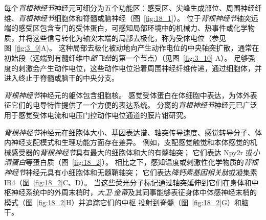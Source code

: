 每个\textit{背根神经节}神经元可细分为五个功能区：感受区、尖峰生成部位、周围神经纤维、\textit{背根神经节}细胞体和脊髓或脑神经（图~\ref{fig:18_1}）。
位于\textit{背根神经节}轴突远端的感受区包含专门的受体蛋白，可感知局部环境中的机械力、热事件或化学物质，并将这些信号转化为轴突末端的局部去极化，称为受体电位（参见图~\ref{fig:3_9}A)。
这种局部去极化被动地向产生动作电位的中央轴突扩散，通常在初始段（远端到有髓纤维中\textit{郎飞结}的第一个节点）（见图~\ref{fig:3_10} A）。
足够强度的刺激会产生动作电位，这些动作电位沿着周围神经纤维传递，通过细胞体，并进入终止于脊髓或脑干的中央分支。


\textit{背根神经节}神经元的躯体包含细胞核。 
感觉受体蛋白在体细胞中表达，为体外表征它们的电导特性提供了一个方便的表达系统。 
分离的\textit{背根神经节}神经元已广泛用于感觉受体电流和电压门控动作电位通道的膜片钳研究。


\textit{背根神经节}神经元在细胞体大小、基因表达谱、轴突传导速度、感觉转导分子、体内神经支配模式和生理功能方面存在差异。 
例如，支配感觉触觉和本体感觉的机械感受器的\textit{背根神经节}具有最大的细胞体和大的有髓轴突； 它们表达 Npy2r 或\textit{小清蛋白}等蛋白质（图~\ref{fig:18_2}）。
相比之下，感知温度或刺激性化学物质的\textit{背根神经节}神经元具有小细胞体和无髓鞘轴突； 它们表达\textit{降钙素基因相关肽}或凝集素 IB4（图~\ref{fig:18_2}C、D）。 
当这些荧光分子标记通过轴突延伸到它们在身体和中枢神经系统中的外周末梢时，\textit{大卫$\cdot$金蒂}及其同事能够表征身体中体感神经末梢的模式（图~\ref{fig:18_2}H）并追踪它们的中枢 投射到脊髓（图~\ref{fig:18_2}G）和脑干。

